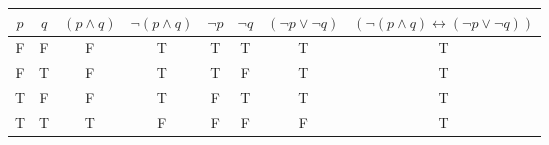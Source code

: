 \begin{tabular}{|c|c||c|c|c|c|c|c|}
\hline
$ p $ & $ q $ & $ (p \wedge q) $ & $  \neg (p \wedge q) $ & $  \neg p $ & $  \neg q $ & $ ( \neg p \vee  \neg q) $ & $ ( \neg (p \wedge q) \leftrightarrow ( \neg p \vee  \neg q)) $ \\
\hline
F & F & F & T & T & T & T & T \\
F & T & F & T & T & F & T & T \\
T & F & F & T & F & T & T & T \\
T & T & T & F & F & F & F & T \\
\hline
\end{tabular}
